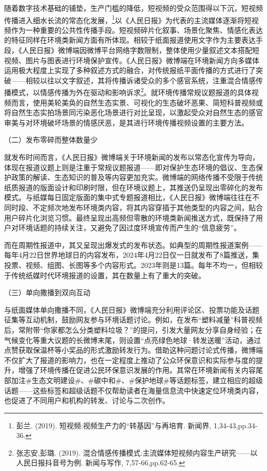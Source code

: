 随着数字技术基础的铺垫，生产门槛的降低，短视频的受众范围得以下沉，短视频传播进入细水长流的常态化发展，\footnote{彭兰.
  (2019). 短视频:视频生产力的``转基因''与再培育. 新闻界,
  1,34-43,pp.34-36.}以《人民日报》为代表的主流媒体逐渐将短视频作为一种重要的公共性传播手段。短视频碎片化叙事、场景化聚焦、情感化表达的特征同样在环境类新闻方面有所体现。相较于纸面报道使用文字作为主要表达手段，《人民日报》微博端因微博平台网络字数限制，整体使用少量叙述文本搭配短视频、图片与图表进行环境保护宣传。《人民日报》微博端在环境新闻方向多媒体运用极大程度上实现了多种叙述方式的融合，对传统报纸平面传播的方式进行了突破------相较以往以文字叙述，其将传播诉诸受众的多个感官系统，注重混合情感传播模式，以情感传播为外在驱动和影响诉求\footnote{张志安,彭璐.
  (2019).
  混合情感传播模式:主流媒体短视频内容生产研究------以人民日报抖音号为例.
  新闻与写作, 7,57-66,pp.62-65.}。就环境传播常规议题报道的具体视频而言，使用美轮美奂的自然生态实景、可视化的生态破坏恶果、简短科普视频或将自然生态实拍场景同污染恶化场景进行对比呈现，以激起受众对自然生态的感官审美与对环境破坏场景的情感厌恶，是其进行环境传播视频设置的主要方法。

（二）发布零碎而整体数量少

就发布时间而言，《人民日报》微博端关于环境新闻的发布以常态化宣传为导向，体现在报道议题上则是注重于常规议题报道------即对保护生态环境的倡议、生态保护政策的解读、生态知识的普及等内容更加充实。微博端的网络传播不受限于传统纸质报道的版面设计和印刷时限，但在环境议题上，其推送仍呈现出零碎化的发布模式。与纸媒每日固定版面的集中式专题报道相比，《人民日报》微博端往往在不同时段、不定频次地发布环境类内容，将其内容穿插于其他类型的内容之间，贴合用户碎片化浏览习惯。最终呈现出高频但零散的环境类新闻推送方式，既保持了用户对环境话题的持续关注，又避免了因过度环境宣传而产生的``信息疲劳''。

而在周期性报道中，其又呈现出爆发式的发布状态。如典型的周期性报道案例------每年4月22日世界地球日的内容发布，2024年4月22日仅一日就发布了8篇推送，集投票、视频、组图、长图等多个内容形式。2023年则是13篇。每年不均一，但相较于传统纸媒时代环境报道的设置，其在数量上有了重大的突破。

（三）单向撒播到双向互动

与纸面媒体单向撒播不同，《人民日报》微博端充分利用评论区、投票功能及话题征集等互动机制，鼓励网友参与环境话题讨论。例如，在发布``塑料减量''科普视频后，常附带``你家都怎么分类塑料垃圾？''的提问，引发大量网友分享自身经验；在气候变化等重大议题的长微博末尾，则设置``点亮绿色地球·转发送暖''活动，通过点赞获取保温杯等小奖品的形式激励转发行为。借助这种问题讨论式传播，微博端不仅扩大了报道的影响力，也在一定程度上推动了公众环保意识和实际参与度的提升，增强了环境传播在促进公民环保意识发展的作用。其常在环境新闻有关内容尾部加注\#生态文明建设\#、\#碳中和\#、\#保护地球\#等话题标签，建立相应的超级话题------这些标签和超级话题不仅帮助读者在海量信息流中快速定位环境类内容，也促进了不同用户和机构的转发、讨论与二次创作。

